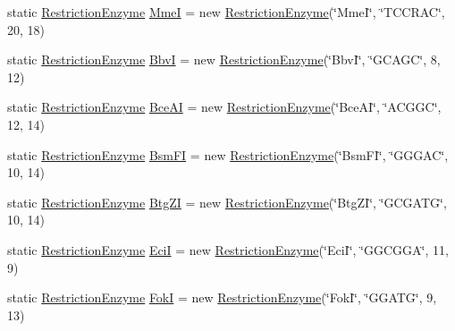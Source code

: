 \begin{DoxyCompactItemize}
\item 
static \hyperlink{classbroad_1_1core_1_1primer3_1_1_restriction_enzyme}{Restriction\+Enzyme} \hyperlink{classbroad_1_1core_1_1primer3_1_1_restriction_enzyme_afa207a18292b8338c49b89f3410db85b}{Mme\+I} = new \hyperlink{classbroad_1_1core_1_1primer3_1_1_restriction_enzyme}{Restriction\+Enzyme}(\char`\"{}Mme\+I\char`\"{}, \char`\"{}T\+C\+C\+R\+A\+C\char`\"{}, 20, 18)
\item 
static \hyperlink{classbroad_1_1core_1_1primer3_1_1_restriction_enzyme}{Restriction\+Enzyme} \hyperlink{classbroad_1_1core_1_1primer3_1_1_restriction_enzyme_aa33ce207b21471dfaa8d405e4e48df37}{Bbv\+I} = new \hyperlink{classbroad_1_1core_1_1primer3_1_1_restriction_enzyme}{Restriction\+Enzyme}(\char`\"{}Bbv\+I\char`\"{}, \char`\"{}G\+C\+A\+G\+C\char`\"{}, 8, 12)
\item 
static \hyperlink{classbroad_1_1core_1_1primer3_1_1_restriction_enzyme}{Restriction\+Enzyme} \hyperlink{classbroad_1_1core_1_1primer3_1_1_restriction_enzyme_ae1f42a6c38d6694c1207963c4feb1754}{Bce\+A\+I} = new \hyperlink{classbroad_1_1core_1_1primer3_1_1_restriction_enzyme}{Restriction\+Enzyme}(\char`\"{}Bce\+A\+I\char`\"{}, \char`\"{}A\+C\+G\+G\+C\char`\"{}, 12, 14)
\item 
static \hyperlink{classbroad_1_1core_1_1primer3_1_1_restriction_enzyme}{Restriction\+Enzyme} \hyperlink{classbroad_1_1core_1_1primer3_1_1_restriction_enzyme_a2b5a80099c82eb040293aa3c9fe54b13}{Bsm\+F\+I} = new \hyperlink{classbroad_1_1core_1_1primer3_1_1_restriction_enzyme}{Restriction\+Enzyme}(\char`\"{}Bsm\+F\+I\char`\"{}, \char`\"{}G\+G\+G\+A\+C\char`\"{}, 10, 14)
\item 
static \hyperlink{classbroad_1_1core_1_1primer3_1_1_restriction_enzyme}{Restriction\+Enzyme} \hyperlink{classbroad_1_1core_1_1primer3_1_1_restriction_enzyme_ada899f908b0a0ebfd311d164f9216611}{Btg\+Z\+I} = new \hyperlink{classbroad_1_1core_1_1primer3_1_1_restriction_enzyme}{Restriction\+Enzyme}(\char`\"{}Btg\+Z\+I\char`\"{}, \char`\"{}G\+C\+G\+A\+T\+G\char`\"{}, 10, 14)
\item 
static \hyperlink{classbroad_1_1core_1_1primer3_1_1_restriction_enzyme}{Restriction\+Enzyme} \hyperlink{classbroad_1_1core_1_1primer3_1_1_restriction_enzyme_a7e778a889c0989411e25cdc3a669e9cc}{Eci\+I} = new \hyperlink{classbroad_1_1core_1_1primer3_1_1_restriction_enzyme}{Restriction\+Enzyme}(\char`\"{}Eci\+I\char`\"{}, \char`\"{}G\+G\+C\+G\+G\+A\char`\"{}, 11, 9)
\item 
static \hyperlink{classbroad_1_1core_1_1primer3_1_1_restriction_enzyme}{Restriction\+Enzyme} \hyperlink{classbroad_1_1core_1_1primer3_1_1_restriction_enzyme_a47d6cc27ccacd3e79743b0fa1ffd7d9f}{Fok\+I} = new \hyperlink{classbroad_1_1core_1_1primer3_1_1_restriction_enzyme}{Restriction\+Enzyme}(\char`\"{}Fok\+I\char`\"{}, \char`\"{}G\+G\+A\+T\+G\char`\"{}, 9, 13)
\end{DoxyCompactItemize}


